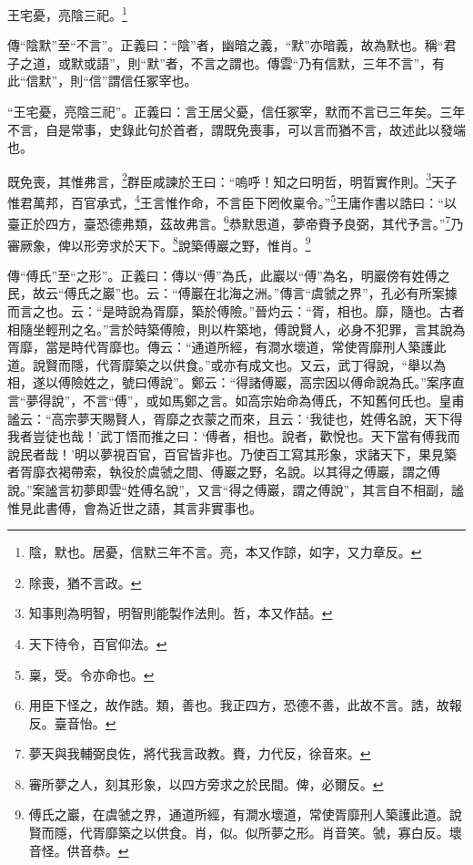 王宅憂，亮陰三祀。\footnote{陰，默也。居憂，信默三年不言。亮，本又作諒，如字，又力章反。}


{\noindent\zhuan{}\fzbyks 傳“陰默”至“不言”。正義曰：“陰”者，幽暗之義，“默”亦暗義，故為默也。稱“君子之道，或默或語”，則“默”者，不言之謂也。傳雲“乃有信默，三年不言”，有此“信默”，則“信”謂信任冢宰也。 \par}

{\noindent\shu{}\fzkt “王宅憂，亮陰三祀”。正義曰：言王居父憂，信任冢宰，默而不言已三年矣。三年不言，自是常事，史錄此句於首者，謂既免喪事，可以言而猶不言，故述此以發端也。 \par}

既免喪，其惟弗言，\footnote{除喪，猶不言政。}群臣咸諫於王曰：“嗚呼！知之曰明哲，明晢實作則。\footnote{知事則為明智，明智則能製作法則。哲，本又作喆。}天子惟君萬邦，百官承式，\footnote{天下待令，百官仰法。}王言惟作命，不言臣下罔攸稟令。”\footnote{稟，受。令亦命也。}王庸作書以誥曰：“以臺正於四方，臺恐德弗類，茲故弗言。\footnote{用臣下怪之，故作誥。類，善也。我正四方，恐德不善，此故不言。誥，故報反。臺音怡。}恭默思道，夢帝賚予良弼，其代予言。”\footnote{夢天與我輔弼良佐，將代我言政教。賚，力代反，徐音來。}乃審厥象，俾以形旁求於天下。\footnote{審所夢之人，刻其形象，以四方旁求之於民間。俾，必爾反。}說築傅巖之野，惟肖。\footnote{傅氏之巖，在虞虢之界，通道所經，有澗水壞道，常使胥靡刑人築護此道。說賢而隱，代胥靡築之以供食。肖，似。似所夢之形。肖音笑。虢，寡白反。壞音怪。供音恭。}

{\noindent\zhuan{}\fzbyks 傳“傅氏”至“之形”。正義曰：傳以“傅”為氏，此巖以“傅”為名，明巖傍有姓傅之民，故云“傅氏之巖”也。云：“傅巖在北海之洲。”傳言“虞虢之界”，孔必有所案據而言之也。云：“是時說為胥靡，築於傅險。”晉灼云：“胥，相也。靡，隨也。古者相隨坐輕刑之名。”言於時築傅險，則以杵築地，傅說賢人，必身不犯罪，言其說為胥靡，當是時代胥靡也。傳云：“通道所經，有澗水壞道，常使胥靡刑人築護此道。說賢而隱，代胥靡築之以供食。”或亦有成文也。又云，武丁得說，“舉以為相，遂以傅險姓之，號曰傅說”。鄭云：“得諸傅巖，高宗因以傅命說為氏。”案序直言“夢得說”，不言“傅”，或如馬鄭之言。如高宗始命為傅氏，不知舊何氏也。皇甫謐云：“高宗夢天賜賢人，胥靡之衣蒙之而來，且云：‘我徒也，姓傅名說，天下得我者豈徒也哉！’武丁悟而推之曰：‘傅者，相也。說者，歡悅也。天下當有傅我而說民者哉！’明以夢視百官，百官皆非也。乃使百工寫其形象，求諸天下，果見築者胥靡衣褐帶索，執役於虞虢之間、傅巖之野，名說。以其得之傅巖，謂之傅說。”案謐言初夢即雲“姓傅名說”，又言“得之傅巖，謂之傅說”，其言自不相副，謐惟見此書傅，會為近世之語，其言非實事也。 \par}

